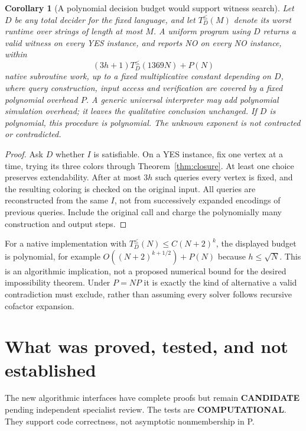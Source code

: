 \documentclass[11pt]{article}
\newtheorem{corollary}[theorem]{Corollary}
\begin{document}
\begin{corollary}[A polynomial decision budget would support witness search]
Let $D$ be any total decider for the fixed language, and let
$T_D^{\le}(M)$ denote its worst runtime over strings of length at most $M$.
A uniform program using $D$ returns a valid witness on every YES instance,
and reports NO on every NO instance, within
\[
        (3h+1)T_D^{\le}(1369N)+P(N)
\]
native subroutine work, up to a fixed multiplicative constant depending on $D$,
where query construction, input access and verification are covered by a
fixed polynomial overhead $P$. A generic universal interpreter may add
polynomial simulation overhead; it leaves the qualitative conclusion unchanged.
If $D$ is polynomial, this procedure
is polynomial. The unknown exponent is not contracted or contradicted.
\end{corollary}
\begin{proof}
Ask $D$ whether $I$ is satisfiable. On a YES instance, fix one vertex at a
time, trying its three colors through Theorem~\ref{thm:closure}. At least one
choice preserves extendability. After at most $3h$ such queries every vertex
is fixed, and the resulting coloring is checked on the original input.
All queries are reconstructed from the same $I$, not from successively
expanded encodings of previous queries. Include the original call and charge
the polynomially many construction and output steps.
\end{proof}

For a native implementation with $T_D^{\le}(N)\le C(N+2)^k$, the displayed
budget is polynomial, for example $O((N+2)^{k+1/2})+P(N)$ because
$h\le\sqrt N$. This is an algorithmic implication, not a proposed numerical
bound for the desired impossibility theorem. Under $P=NP$ it is exactly the
kind of alternative a valid contradiction must exclude, rather than
assuming every solver follows recursive cofactor expansion.

\section{What was proved, tested, and not established}
The new algorithmic interfaces have complete proofs but remain
\textbf{CANDIDATE} pending independent specialist review. The tests are
\textbf{COMPUTATIONAL}. They support code correctness, not asymptotic
nonmembership in P.
\end{document}
